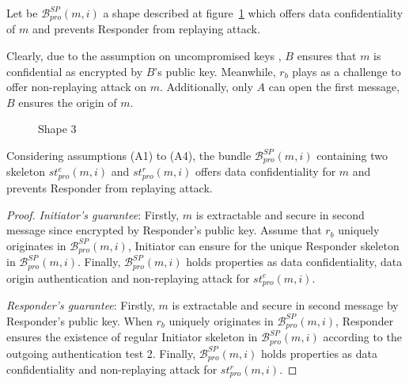 Let be $\mathcal{B}^{SP}_{pro}(m,i)$ a shape described at figure~\ref{protocol3} which offers data confidentiality of $m$ and prevents Responder from replaying attack. 

Clearly, due to the assumption on uncompromised keys , $B$ ensures that $m$ is confidential as encrypted by $B$'s public key. Meanwhile, $r_b$ plays as a challenge to offer non-replaying attack on $m$. Additionally, only $A$ can open the first message, $B$ ensures the origin of $m$.  

\begin{figure}
\begin{center}
\end{center}
\caption{Shape 3} 
\label{protocol3}
\end{figure}

\begin{Proposition}
Considering assumptions (A1) to (A4), the bundle $\mathcal{B}^{SP}_{pro}(m,i)$ containing two skeleton $st^e_{pro}(m,i)$ and $st^r_{pro}(m,i)$ offers data confidentiality for $m$ and prevents Responder from replaying attack. 
\end{Proposition}

\begin{proof}
\emph{Initiator's guarantee}: Firstly, $m$ is extractable and secure in second message since encrypted by Responder's public key. Assume that $r_b$ uniquely originates in $\mathcal{B}^{SP}_{pro}(m,i)$, Initiator can ensure for the unique Responder skeleton in $\mathcal{B}^{SP}_{pro}(m,i)$. Finally, $\mathcal{B}^{SP}_{pro}(m,i)$ holds properties as data confidentiality, data origin authentication and non-replaying attack for $st^e_{pro}(m,i)$.

\emph{Responder's guarantee}: Firstly, $m$ is extractable and secure in second message by Responder's public key. When $r_b$ uniquely originates in $\mathcal{B}^{SP}_{pro}(m,i)$, Responder ensures the existence of regular Initiator skeleton in $\mathcal{B}^{SP}_{pro}(m,i)$ according to the outgoing authentication test 2. Finally, $\mathcal{B}^{SP}_{pro}(m,i)$ holds properties as data confidentiality and non-replaying attack for $st^r_{pro}(m,i)$.
 \end{proof}

